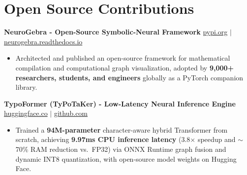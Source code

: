 \documentclass[9.5pt,a4paper]{article}
\begin{document}
\section*{Open Source Contributions}
\noindent
\textbf{NeuroGebra - Open-Source Symbolic-Neural Framework} \hfill \href{https://pypi.org/project/neurogebra/}{pypi.org} $\vert$ \href{https://neurogebra.readthedocs.io}{neurogebra.readthedocs.io}
\begin{itemize}
    \item Architected and published an open-source framework for mathematical compilation and computational graph visualization, adopted by \textbf{9,000+ researchers, students, and engineers} globally as a PyTorch companion library.
\end{itemize}
\vspace{0.6pt}
\noindent
\textbf{TypoFormer (TyPoTaKer) - Low-Latency Neural Inference Engine} \hfill \href{https://huggingface.co/fahiiim/TypoFormer}{huggingface.co} $\vert$ \href{https://github.com/fahiiim/TyPoTaKer}{github.com}
\begin{itemize}
    \item Trained a \textbf{94M-parameter} character-aware hybrid Transformer from scratch, achieving \textbf{9.97ms CPU inference latency} (3.8$\times$ speedup and $\sim$70\% RAM reduction vs.\ FP32) via ONNX Runtime graph fusion and dynamic INT8 quantization, with open-source model weights on Hugging Face.
\end{itemize}
\vspace{0.6pt}
\end{document}
